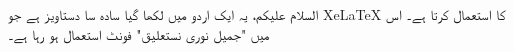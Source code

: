 \documentclass[12pt]{article}
\begin{document}
\begin{urdu}
السلام علیکم، یہ ایک اردو میں لکھا گیا سادہ سا دستاویز ہے جو XeLaTeX کا استعمال کرتا ہے۔ اس میں "جمیل نوری نستعلیق" فونٹ استعمال ہو رہا ہے۔
\end{urdu}
\end{document}
